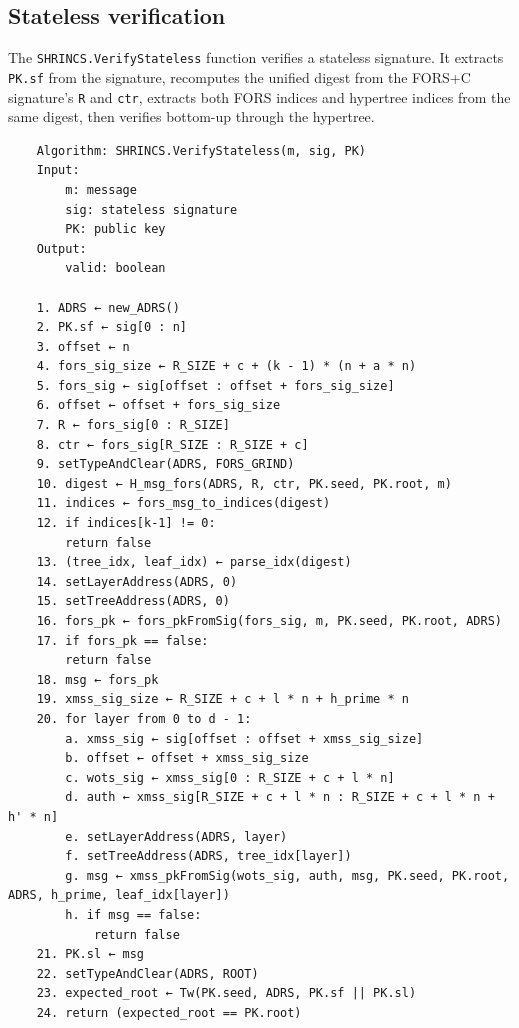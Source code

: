 \subsection{Stateless verification}
The \texttt{SHRINCS.VerifyStateless} function verifies a stateless signature. It extracts \texttt{PK.sf} from the signature, recomputes the unified digest from the FORS+C signature's \texttt{R} and \texttt{ctr}, extracts both FORS indices and hypertree indices from the same digest, then verifies bottom-up through the hypertree.
\begin{verbatim}
    Algorithm: SHRINCS.VerifyStateless(m, sig, PK)
    Input:
        m: message
        sig: stateless signature
        PK: public key
    Output:
        valid: boolean

    1. ADRS ← new_ADRS()
    2. PK.sf ← sig[0 : n]
    3. offset ← n
    4. fors_sig_size ← R_SIZE + c + (k - 1) * (n + a * n)
    5. fors_sig ← sig[offset : offset + fors_sig_size]
    6. offset ← offset + fors_sig_size
    7. R ← fors_sig[0 : R_SIZE]
    8. ctr ← fors_sig[R_SIZE : R_SIZE + c]
    9. setTypeAndClear(ADRS, FORS_GRIND)
    10. digest ← H_msg_fors(ADRS, R, ctr, PK.seed, PK.root, m)
    11. indices ← fors_msg_to_indices(digest)
    12. if indices[k-1] != 0:
        return false
    13. (tree_idx, leaf_idx) ← parse_idx(digest)
    14. setLayerAddress(ADRS, 0)
    15. setTreeAddress(ADRS, 0)
    16. fors_pk ← fors_pkFromSig(fors_sig, m, PK.seed, PK.root, ADRS)
    17. if fors_pk == false:
        return false  
    18. msg ← fors_pk
    19. xmss_sig_size ← R_SIZE + c + l * n + h_prime * n
    20. for layer from 0 to d - 1:
        a. xmss_sig ← sig[offset : offset + xmss_sig_size]
        b. offset ← offset + xmss_sig_size
        c. wots_sig ← xmss_sig[0 : R_SIZE + c + l * n]
        d. auth ← xmss_sig[R_SIZE + c + l * n : R_SIZE + c + l * n + h' * n]
        e. setLayerAddress(ADRS, layer)
        f. setTreeAddress(ADRS, tree_idx[layer])
        g. msg ← xmss_pkFromSig(wots_sig, auth, msg, PK.seed, PK.root, ADRS, h_prime, leaf_idx[layer])
        h. if msg == false:
            return false
    21. PK.sl ← msg
    22. setTypeAndClear(ADRS, ROOT)
    23. expected_root ← Tw(PK.seed, ADRS, PK.sf || PK.sl)
    24. return (expected_root == PK.root)
\end{verbatim}

